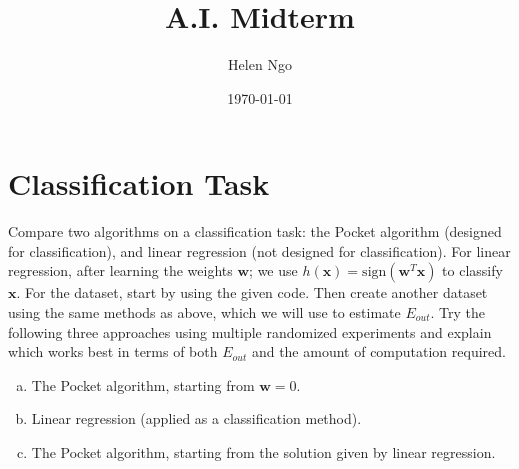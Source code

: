 \documentclass[a4paper]{article}
\title{A.I. Midterm}
\author{Helen Ngo}
\date{\today}							%
\begin{document}
\maketitle
\section{Classification Task} 

Compare two algorithms on a classification task: the Pocket algorithm (designed for classification), and linear regression (not designed for classification). For linear regression, after learning the weights $\textbf{w}$; we use $h(\textbf{x}) = \textrm{sign}(\textbf{w}^T\textbf{x})$ to classify $\textbf{x}$. For the dataset, start by using the given code. Then create another dataset using the same methods as above, which we will use to estimate $E_{out}$. Try the following three approaches using multiple randomized experiments and explain which works best in terms of both $E_{out}$ and the amount of computation required. 

\begin{enumerate}[(a)]
\item The Pocket algorithm, starting from $\textbf{w} = 0$.
\item Linear regression (applied as a classification method).
\item The Pocket algorithm, starting from the solution given by linear regression.
\end{enumerate}
\end{document}
